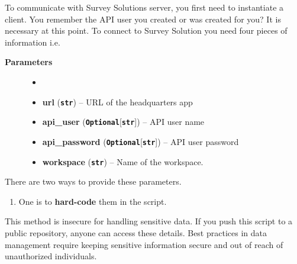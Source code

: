 \documentclass[
  letterpaper,
  DIV=11,
  numbers=noendperiod]{scrreprt}
\providecommand{\tightlist}{%
  \setlength{\itemsep}{0pt}\setlength{\parskip}{0pt}}\usepackage{longtable,booktabs,array}
\begin{document}
To communicate with Survey Solutions server, you first need to
instantiate a client. You remember the API user you created or was
created for you? It is necessary at this point. To connect to Survey
Solution you need four pieces of information i.e.

\begin{description}
\item[\textbf{Parameters}]
\begin{itemize}
\item[]
\item
  \textbf{url} (\textbf{\texttt{str}}) -- URL of the headquarters app
\item
  \textbf{api\_user}
  (\textbf{\texttt{Optional}}{[}\textbf{\texttt{str}}{]}) -- API user
  name
\item
  \textbf{api\_password}
  (\textbf{\texttt{Optional}}{[}\textbf{\texttt{str}}{]}) -- API user
  password
\item
  \textbf{workspace} (\textbf{\texttt{str}}) -- Name of the workspace.
\end{itemize}
\end{description}

There are two ways to provide these parameters.

\begin{enumerate}
\def\labelenumi{\arabic{enumi}.}
\tightlist
\item
  One is to \textbf{hard-code} them in the script.
\end{enumerate}

This method is insecure for handling sensitive data. If you push this
script to a public repository, anyone can access these details. Best
practices in data management require keeping sensitive information
secure and out of reach of unauthorized individuals.
\end{document}
